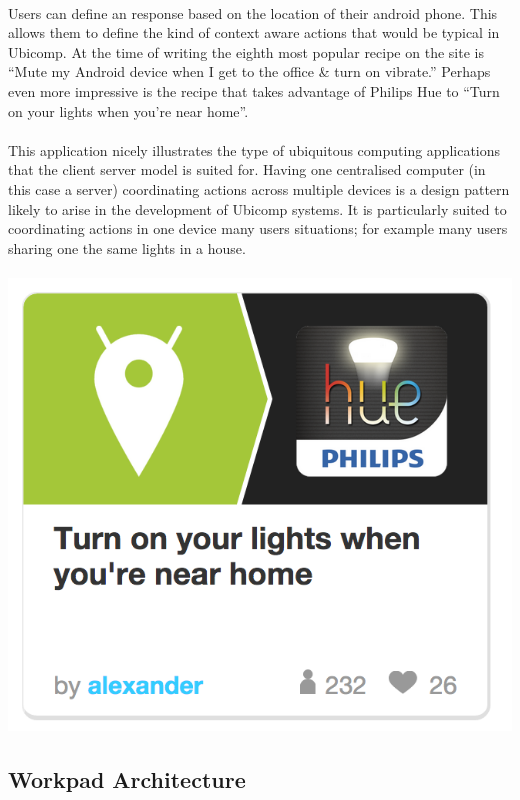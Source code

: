 \documentclass[11pt]{amsart}
\begin{document}
\paragraph{}
Users can define an response based on the location of their android phone. This allows them to define the kind of context aware actions that would be typical in Ubicomp. At the time of writing the eighth most popular recipe on the site is ``Mute my Android device when I get to the office & turn on vibrate.'' Perhaps even more impressive is the recipe that takes advantage of Philips Hue to ``Turn on your lights when you're near home''.
\paragraph{}
This application nicely illustrates the type of ubiquitous computing applications that the client server model is suited for. Having one centralised computer (in this case a server) coordinating actions across multiple devices is a design pattern likely to arise in the development of Ubicomp systems. It is particularly suited to coordinating actions in one device many users situations; for example many users sharing one the same lights in a house.
\paragraph{}
\includegraphics[scale=1]{IFTTT}

\subsection{Workpad Architecture}\cite{catarci2008pervasive}
\end{document}
